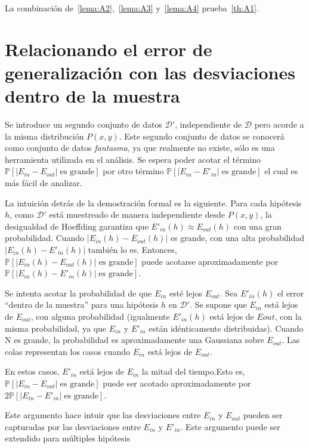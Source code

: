 La combinación de~\ref{lema:A2},~\ref{lema:A3} y~\ref{lema:A4} prueba~\ref{th:A1}.

\section{Relacionando el error de generalización con las desviaciones dentro
de la muestra}

Se introduce un segundo conjunto de datos $\mathcal{D}'$, independiente de
$\mathcal{D}$ pero acorde a la misma distribución $P(x,y)$. Este segundo conjunto
de datos se conocerá como conjunto de datos \emph{fantasma}, ya que realmente
no existe, sólo es una herramienta utilizada en el análisis. Se espera poder
acotar el término $\mathbb{P} \left[| E_{in} - E_{out} | \;\text{es grande} \right]$
por otro término $\mathbb{P} \left[| E_{in} - E'_{in} | \;\text{es grande} \right]$
el cual es más fácil de analizar.

La intuición detrás de la demostración formal es la siguiente. Para cada hipótesis
$h$, como $\mathcal{D}'$ está muestreado de manera independiente desde $P(x,y)$,
la desigualdad de Hoeffding garantiza que $E'_{in}(h) \approx E_{out}(h)$ con
una gran probabilidad. Cuando $| E_{in}(h) - E_{out}(h) |$ es grande, con una
alta probabilidad $| E_{in}(h) - E'_{in}(h) |$ también lo es. Entonces,
$\mathbb{P} \left[| E_{in}(h) - E_{out}(h) | \;\text{es grande} \right]$ puede acotarse aproximadamente por
$\mathbb{P} \left[| E_{in}(h) - E'_{in}(h) | \;\text{es grande} \right]$.


Se intenta acotar la probabilidad de que $E_{in}$ esté lejos $E_{out}$. Sea
$E'_{in}(h)$ el error ``dentro de la muestra'' para una hipótesis $h$ en $\mathcal{D}'$.
Se supone que $E_{in}$ está lejos de $E_{out}$, con alguna probabilidad
(igualmente $E'_{in}(h)$ está lejos de $E{out}$, con la misma probabilidad, ya
que $E_{in}$ y $E'_{in}$ están idénticamente distribuidas). Cuando N es grande,
la probabilidad es aproximadamente una Gaussiana sobre $E_{out}$. Las colas
representan los casos cuando $E_{in}$ está lejos de $E_{out}$.

En estos casos, $E'_{in}$ está lejos de $E_{in}$ la mitad del tiempo.Esto es,
$\mathbb{P} \left[| E_{in} - E_{out} | \;\text{es grande} \right]$
puede ser acotado aproximadamente por
$2   \mathbb{P} \left[| E_{in} - E'_{in} | \;\text{es grande} \right]$.

Este argumento hace intuir que las desviaciones entre $E_{in}$ y $E_{out}$ pueden
ser capturadas por las desviaciones entre $E_{in}$ y $E'_{in}$.
Este argumento puede ser extendido para múltiples hipótesis


